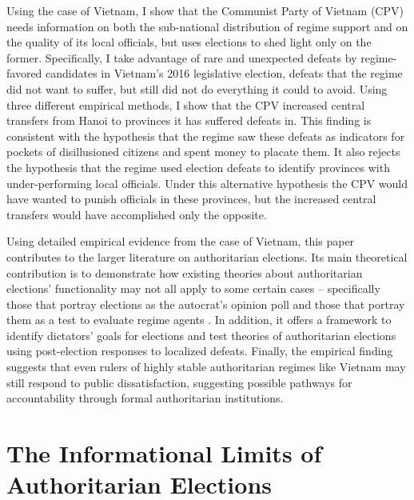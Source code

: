 \documentclass[12pt]{article}
\newcommand{\1}{\mathbbm{1}}
\begin{document}
Using the case of Vietnam, I show that the Communist Party of Vietnam (CPV) needs information on both the sub-national distribution of regime support and on the quality of its local officials, but uses elections to shed light only on the former. Specifically, I take advantage of rare and unexpected defeats by regime-favored candidates in Vietnam's 2016 legislative election, defeats that the regime did not want to suffer, but still did not do everything it could to avoid. Using three different empirical methods, I show that the CPV increased central transfers from Hanoi to provinces it has suffered defeats in. This finding is consistent with the hypothesis that the regime saw these defeats as indicators for pockets of disillusioned citizens and spent money to placate them. It also rejects the hypothesis that the regime used election defeats to identify provinces with under-performing local officials. Under this alternative hypothesis the CPV would have wanted to punish officials in these provinces, but the increased central transfers would have accomplished only the opposite.

Using detailed empirical evidence from the case of Vietnam, this paper contributes to the larger literature on authoritarian elections. Its main theoretical contribution is to demonstrate how existing theories about authoritarian elections' functionality may not all apply to some certain cases -- specifically those that portray elections as the autocrat's opinion poll \citep[e.g.][]{Miller2015, Magaloni2006, Blaydes2008} and those that portray them as a test to evaluate regime agents \citep[e.g.][]{Magaloni2006, Blaydes2008,Myagkov2009,RundlettSvolik2016}. In addition, it offers a framework to identify dictators' goals for elections and test theories of authoritarian elections using post-election responses to localized defeats. Finally, the empirical finding suggests that even rulers of highly stable authoritarian regimes like Vietnam may still respond to public dissatisfaction, suggesting possible pathways for accountability through formal authoritarian institutions.

\section{The Informational Limits of Authoritarian Elections}
\label{sec:theory_limits}
\end{document}
